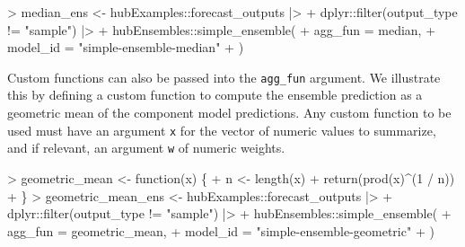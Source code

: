 \documentclass[
  letterpaper,
  DIV=11,
  numbers=noendperiod]{scrartcl}
\newenvironment{Shaded}{\begin{snugshade}}{\end{snugshade}}
\newcommand{\AttributeTok}[1]{\textcolor[rgb]{0.40,0.45,0.13}{#1}}
\newcommand{\ControlFlowTok}[1]{\textcolor[rgb]{0.00,0.23,0.31}{#1}}
\newcommand{\DecValTok}[1]{\textcolor[rgb]{0.68,0.00,0.00}{#1}}
\newcommand{\FunctionTok}[1]{\textcolor[rgb]{0.28,0.35,0.67}{#1}}
\newcommand{\NormalTok}[1]{\textcolor[rgb]{0.00,0.23,0.31}{#1}}
\newcommand{\OtherTok}[1]{\textcolor[rgb]{0.00,0.23,0.31}{#1}}
\newcommand{\SpecialCharTok}[1]{\textcolor[rgb]{0.37,0.37,0.37}{#1}}
\newcommand{\StringTok}[1]{\textcolor[rgb]{0.13,0.47,0.30}{#1}}
\begin{document}
\begin{Shaded}
\begin{Highlighting}[]
\SpecialCharTok{\textgreater{}}\NormalTok{ median\_ens }\OtherTok{\textless{}{-}}\NormalTok{ hubExamples}\SpecialCharTok{::}\NormalTok{forecast\_outputs }\SpecialCharTok{|\textgreater{}}
\SpecialCharTok{+}\NormalTok{     dplyr}\SpecialCharTok{::}\FunctionTok{filter}\NormalTok{(output\_type }\SpecialCharTok{!=} \StringTok{"sample"}\NormalTok{) }\SpecialCharTok{|\textgreater{}}
\SpecialCharTok{+}\NormalTok{     hubEnsembles}\SpecialCharTok{::}\FunctionTok{simple\_ensemble}\NormalTok{(}
\SpecialCharTok{+}       \AttributeTok{agg\_fun =}\NormalTok{ median,}
\SpecialCharTok{+}       \AttributeTok{model\_id =} \StringTok{"simple{-}ensemble{-}median"}
\SpecialCharTok{+}\NormalTok{     )}
\end{Highlighting}
\end{Shaded}

Custom functions can also be passed into the \texttt{agg\_fun} argument.
We illustrate this by defining a custom function to compute the ensemble
prediction as a geometric mean of the component model predictions. Any
custom function to be used must have an argument \texttt{x} for the
vector of numeric values to summarize, and if relevant, an argument
\texttt{w} of numeric weights.

\begin{Shaded}
\begin{Highlighting}[]
\SpecialCharTok{\textgreater{}}\NormalTok{ geometric\_mean }\OtherTok{\textless{}{-}} \ControlFlowTok{function}\NormalTok{(x) \{}
\SpecialCharTok{+}\NormalTok{     n }\OtherTok{\textless{}{-}} \FunctionTok{length}\NormalTok{(x)}
\SpecialCharTok{+}     \FunctionTok{return}\NormalTok{(}\FunctionTok{prod}\NormalTok{(x)}\SpecialCharTok{\^{}}\NormalTok{(}\DecValTok{1} \SpecialCharTok{/}\NormalTok{ n))}
\SpecialCharTok{+}\NormalTok{   \}}
\SpecialCharTok{\textgreater{}}\NormalTok{ geometric\_mean\_ens }\OtherTok{\textless{}{-}}\NormalTok{ hubExamples}\SpecialCharTok{::}\NormalTok{forecast\_outputs }\SpecialCharTok{|\textgreater{}}
\SpecialCharTok{+}\NormalTok{     dplyr}\SpecialCharTok{::}\FunctionTok{filter}\NormalTok{(output\_type }\SpecialCharTok{!=} \StringTok{"sample"}\NormalTok{) }\SpecialCharTok{|\textgreater{}}
\SpecialCharTok{+}\NormalTok{     hubEnsembles}\SpecialCharTok{::}\FunctionTok{simple\_ensemble}\NormalTok{(}
\SpecialCharTok{+}       \AttributeTok{agg\_fun =}\NormalTok{ geometric\_mean,}
\SpecialCharTok{+}       \AttributeTok{model\_id =} \StringTok{"simple{-}ensemble{-}geometric"}
\SpecialCharTok{+}\NormalTok{     )}
\end{Highlighting}
\end{Shaded}
\end{document}
